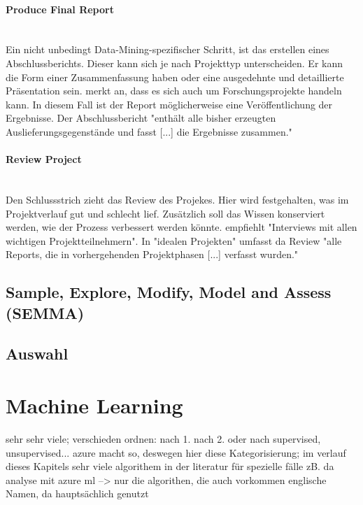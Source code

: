 \paragraph{Produce Final Report}\mbox{} \\
Ein nicht unbedingt Data-Mining-spezifischer Schritt, ist das erstellen eines Abschlussberichts. Dieser kann sich je nach Projekttyp unterscheiden. Er kann die Form einer Zusammenfassung haben oder eine ausgedehnte und detaillierte Präsentation sein. \citep[Punkt 1.4.1.1]{larose_discovering_2014} merkt an, dass es sich auch um Forschungsprojekte handeln kann. In diesem Fall ist der Report möglicherweise  eine Veröffentlichung der Ergebnisse. Der Abschlussbericht "enthält alle bisher erzeugten Auslieferungsgegenstände und fasst [...] die Ergebnisse zusammen."\citep[S~18; eigene Übersetzung]{shearer_crisp-dm_2000}

\paragraph{Review Project}\mbox{} \\
Den Schlussstrich zieht das Review des Projekes. Hier wird festgehalten, was im Projektverlauf gut und schlecht lief. Zusätzlich soll das Wissen konserviert werden, wie der Prozess verbessert werden könnte.   \newline
\citep[S.~18; eigene Übersetzung]{shearer_crisp-dm_2000} empfiehlt "Interviews mit allen wichtigen Projektteilnehmern". In "idealen Projekten" umfasst da Review "alle Reports, die in vorhergehenden Projektphasen [...] verfasst wurden."\citep[S.~29; eigene Übersetzung]{chapman_crisp-dm_2000}







\subsection{Sample, Explore, Modify, Model and Assess (SEMMA)}
\subsection{Auswahl}


\section{Machine Learning}\label{sec:MachineLearning} 
sehr sehr viele; verschieden ordnen:
	nach 1.
	nach 2.
	oder nach supervised, unsupervised...
azure macht so, deswegen hier diese Kategorisierung;
im verlauf dieses Kapitels sehr viele algorithem in der literatur für spezielle fälle zB.
da analyse mit azure ml --> nur die algorithen, die auch vorkommen 
englische Namen, da hauptsächlich genutzt

